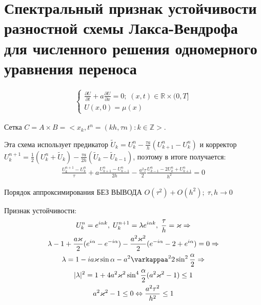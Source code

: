 \documentclass[__main__.tex]{subfiles}
\begin{document}
\section{Спектральный признак устойчивости разностной схемы Лакса-Вендрофа для численного решения одномерного уравнения переноса}

\begin{gather*}
	\begin{cases}
	\frac{\partial U}{\partial t}+a\frac{\partial U}{\partial x}=0;\; (x,t)\in\mathbb{R}\times(0,T]\\
	U(x,0)=\mu(x)
	\end{cases}
\end{gather*}

Сетка $C=A\times B=<x_k,t^n=(kh,\tau n):k\in\mathbb{Z}>.$

Эта схема использует предикатор $\tilde{U}_k=U_k^n-\frac{\tau a}{h}(U_{k+1}^n-U_k^n)$ и корректор $U_k^{n+1}=\frac{1}{2}(U_k^n+\tilde{U}_k)-\frac{\tau a}{2h}(\tilde{U}_k-\tilde{U}_{k-1})$, поэтому в итоге получается:
\begin{gather*}
\frac{U_k^{n+1}-U_k^n}{\tau}+a\frac{U_{k+1}^n-U_{k-1}^n}{2h}-\frac{a^2\tau}{2}\frac{U_{k-1}^n-2U_k^n+U_{k+1}^n}{h^2}=0
\end{gather*}

Порядок аппроксимирования БЕЗ ВЫВОДА $O(\tau^2)+O(h^2);\;\tau,h\rightarrow0$

Признак устойчивости:
\begin{gather*}
	U_k^n=e^{i\alpha k},\;U_k^{n+1}=\lambda e^{i\alpha k},\; \frac{\tau}{h}=\varkappa\Rightarrow\\
	\lambda-1+\frac{a\varkappa}{2}(e^{i\alpha}-e^{-i\alpha})-\frac{a^2\varkappa^2}{2}(e^{-i\alpha}-2+e^{i\alpha})=0\Rightarrow\\
	\lambda=1-ia\varkappa\sin\alpha-a^2\varkappaa^22\sin^2\frac{\alpha}{2}\Rightarrow\\
	|\lambda|^2=1+4a^2\varkappa^2\sin^4\frac{\alpha}{2}(a^2\varkappa^2-1)\le 1\\
	a^2\varkappa^2-1\le 0\Leftrightarrow \frac{a^2\tau^2}{h^2}\le 1
\end{gather*}
\end{document}
